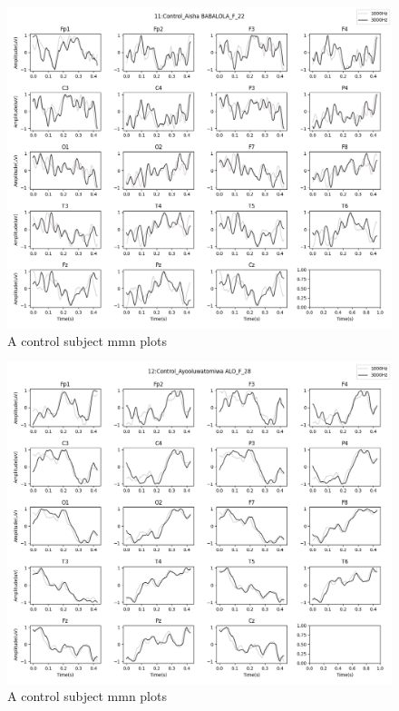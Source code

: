 \documentclass[10pt]{article}
\begin{document}
\begin{figure}[H]
  \includegraphics[width=16cm]{../../../data_analysis_results/MMN/time_series/Control/11.png}
  \caption{A control subject \gls{mmn} plots}
\end{figure}
\begin{figure}[H]
  \includegraphics[width=16cm]{../../../data_analysis_results/MMN/time_series/Control/12.png}
  \caption{A control subject \gls{mmn} plots}
\end{figure}
\end{document}
